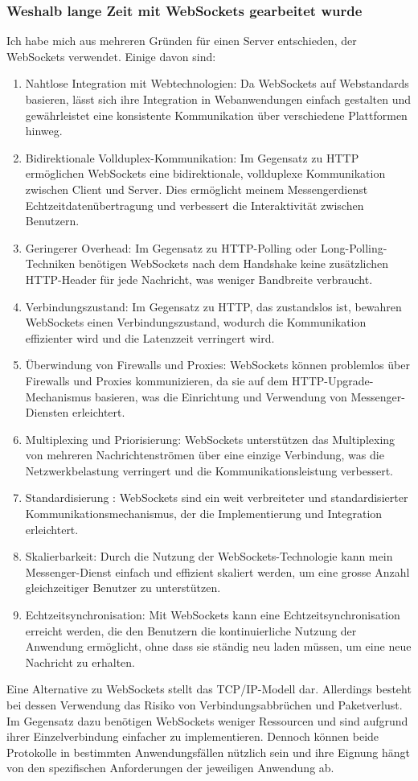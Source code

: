 \subsubsection{Weshalb lange Zeit mit WebSockets gearbeitet wurde}
Ich habe mich aus mehreren Gründen für einen Server entschieden, der WebSockets verwendet. Einige davon sind: \cite{fette2011websocket}\cite{gupta2017websockets} 
\begin{enumerate}
    \item Nahtlose Integration mit Webtechnologien: Da WebSockets auf Webstandards basieren, lässt sich ihre Integration in Webanwendungen einfach gestalten und gewährleistet eine konsistente Kommunikation über verschiedene Plattformen hinweg.
    \item Bidirektionale Vollduplex-Kommunikation: Im Gegensatz zu HTTP ermöglichen WebSockets eine bidirektionale, vollduplexe Kommunikation zwischen Client und Server. Dies ermöglicht meinem Messengerdienst Echtzeitdatenübertragung und verbessert die Interaktivität zwischen Benutzern.
    \item Geringerer Overhead: Im Gegensatz zu HTTP-Polling oder Long-Polling-Techniken benötigen WebSockets nach dem Handshake keine zusätzlichen HTTP-Header für jede Nachricht, was weniger Bandbreite verbraucht.
    \item Verbindungszustand: Im Gegensatz zu HTTP, das zustandslos ist, bewahren WebSockets einen Verbindungszustand, wodurch die Kommunikation effizienter wird und die Latenzzeit verringert wird.
    \item Überwindung von Firewalls und Proxies: WebSockets können problemlos über Firewalls und Proxies kommunizieren, da sie auf dem HTTP-Upgrade-Mechanismus basieren, was die Einrichtung und Verwendung von Messenger-Diensten erleichtert.
    \item Multiplexing und Priorisierung: WebSockets unterstützen das Multiplexing von mehreren Nachrichtenströmen über eine einzige Verbindung, was die Netzwerkbelastung verringert und die Kommunikationsleistung verbessert.
    \item Standardisierung \cite{8757486}: WebSockets sind ein weit verbreiteter und standardisierter Kommunikationsmechanismus, der die Implementierung und Integration erleichtert.
    \item Skalierbarkeit: Durch die Nutzung der WebSockets-Technologie kann mein Messenger-Dienst einfach und effizient skaliert werden, um eine grosse Anzahl gleichzeitiger Benutzer zu unterstützen.
    \item Echtzeitsynchronisation: Mit WebSockets kann eine Echtzeitsynchronisation erreicht werden, die den Benutzern die kontinuierliche Nutzung der Anwendung ermöglicht, ohne dass sie ständig neu laden müssen, um eine neue Nachricht zu erhalten.
\end{enumerate}
Eine Alternative zu WebSockets stellt das TCP/IP-Modell dar. Allerdings besteht bei dessen Verwendung das Risiko von Verbindungsabbrüchen und Paketverlust. Im Gegensatz dazu benötigen WebSockets weniger Ressourcen und sind aufgrund ihrer Einzelverbindung einfacher zu implementieren. Dennoch können beide Protokolle in bestimmten Anwendungsfällen nützlich sein und ihre Eignung hängt von den spezifischen Anforderungen der jeweiligen Anwendung ab.
